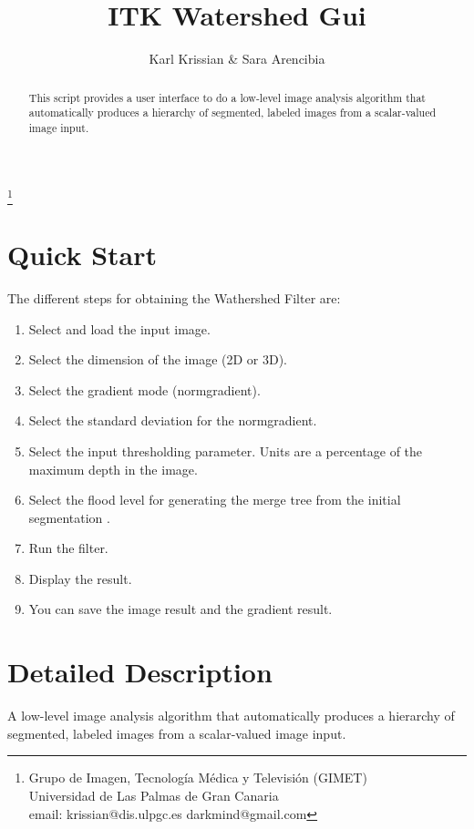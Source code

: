 \documentclass{article}
\begin{document}
\title{ITK Watershed Gui}
\author{Karl Krissian \& Sara Arencibia}
\thanks{
Grupo de Imagen, Tecnolog\'ia M\'edica y Televisi\'on (GIMET)\\
Universidad de Las Palmas de Gran Canaria\\
email: krissian@dis.ulpgc.es darkmind@gmail.com
}


\maketitle

\begin{abstract}
This script provides a user interface to do a low-level image analysis algorithm that automatically produces a hierarchy of segmented, labeled images from a scalar-valued image input.
\end{abstract}


\section{Quick Start}

The different steps for obtaining the Wathershed Filter are:
\begin{enumerate}
  \item Select and load the input image.
  \item Select the dimension of the image (2D or 3D).
  \item Select the gradient mode (normgradient).
  \item Select the standard deviation for the normgradient.
  \item Select the input thresholding parameter. Units are a percentage of the maximum depth in the image.
  \item Select the flood level for generating the merge tree from the initial segmentation .
  \item Run the filter.
  \item Display the result.
  \item You can save the image result and the gradient result.
\end{enumerate}


\section{Detailed Description}
A low-level image analysis algorithm that automatically produces a hierarchy of segmented, labeled images from a scalar-valued image input.
\end{document}
